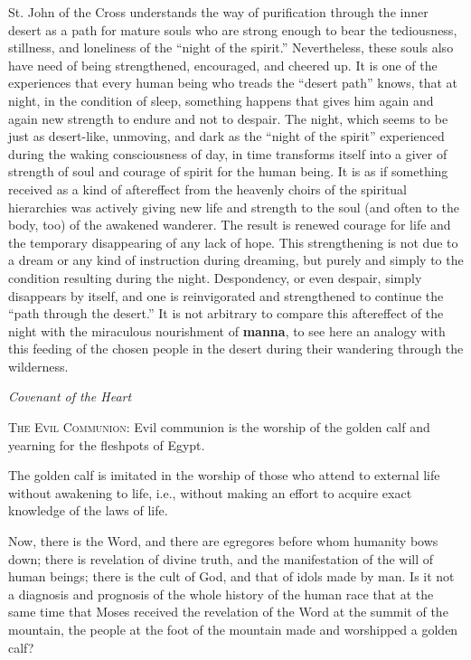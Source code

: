 \begin{quotationx}
St. John of the Cross understands the way of purification through the inner desert as a path for mature souls who are
strong enough to bear the tediousness, stillness, and loneliness of the “night of the spirit.” Nevertheless, these
souls also have need of being strengthened, encouraged, and cheered up. It is one of the experiences that every human
being who treads the “desert path” knows, that at night, in the condition of sleep, something happens that gives him
again and again new strength to endure and not to despair. The night, which seems to be just as desert-like, unmoving,
and dark as the “night of the spirit” experienced during the waking consciousness of day, in time transforms itself
into a giver of strength of soul and courage of spirit for the human being. It is as if something received as a kind of
aftereffect from the heavenly choirs of the spiritual hierarchies was actively giving new life and strength to the soul
(and often to the body, too) of the awakened wanderer. The result is renewed courage for life and the temporary
disappearing of any lack of hope. This strengthening is not due to a dream or any kind of instruction during dreaming,
but purely and simply to the condition resulting during the night. Despondency, or even despair, simply disappears by
itself, and one is reinvigorated and strengthened to continue the “path through the desert.” It is not arbitrary to
compare this aftereffect of the night with the miraculous nourishment of \textbf{manna}, to see here an analogy with
this feeding of the chosen people in the desert during their wandering through the wilderness. \begin{flushright} \emph{Covenant of
the Heart}\end{flushright}

\end{quotationx}

\textsc{The Evil Communion}:
Evil communion is the worship of the golden calf and yearning for the fleshpots of Egypt.

The golden calf is imitated in the worship of those who attend to external life without awakening to life, i.e., without
making an effort to acquire exact knowledge of the laws of life.

Now, there is the Word, and there are egregores before whom humanity bows down; there is revelation of divine truth, and
the manifestation of the will of human beings; there is the cult of God, and that of idols made by man. Is it not a
diagnosis and prognosis of the whole history of the human race that at the same time that Moses received the revelation
of the Word at the summit of the mountain, the people at the foot of the mountain made and worshipped a golden calf?

